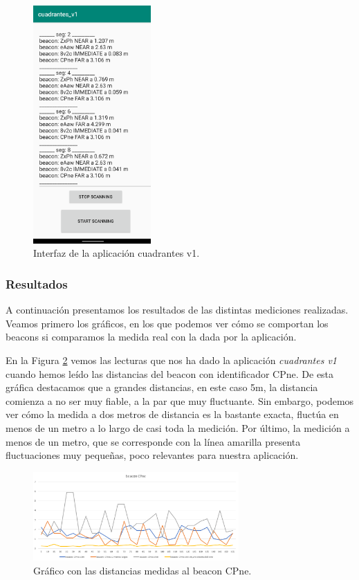 \begin{figure}[t]
	\centering
	\includegraphics[width=0.4\textwidth]{Imagenes/Descripciondeltrabajo/cuadrantes_v1}
	\caption{Interfaz de la aplicación cuadrantes v1.}
	\label{fig:cuadrantesv1}
\end{figure}


\subsubsection{Resultados}

A continuación presentamos los resultados de las distintas mediciones realizadas. Veamos primero los gráficos, en los que podemos ver cómo se comportan los beacons si comparamos la medida real con la dada por la aplicación. 

En la Figura \ref{fig:dist_CPne} vemos las lecturas que nos ha dado la aplicación \textit{cuadrantes v1} cuando hemos leído las distancias del beacon con identificador CPne. De esta gráfica destacamos que a grandes distancias, en este caso 5m, la distancia comienza a no ser muy fiable, a la par que muy fluctuante. Sin embargo, podemos ver cómo la medida a dos metros de distancia es la bastante exacta, fluctúa en menos de un metro a lo largo de casi toda la medición. Por último, la medición a menos de un metro, que se corresponde con la línea amarilla presenta fluctuaciones muy pequeñas, poco relevantes para nuestra aplicación. 

\begin{figure}[t]
	\centering
	\includegraphics[width=0.7\textwidth]{Imagenes/Descripciondeltrabajo/dist_CPne}
	\caption{Gráfico con las distancias medidas al beacon CPne. }
	\label{fig:dist_CPne}
\end{figure}

